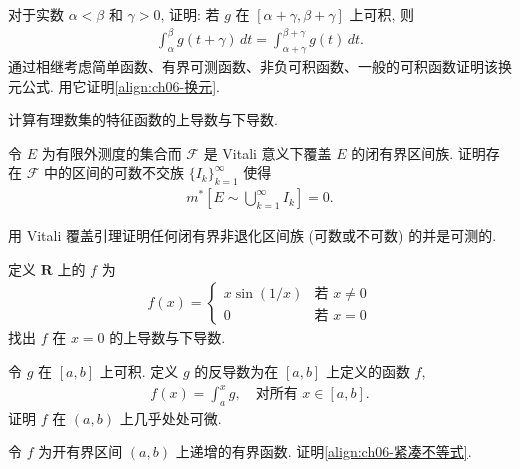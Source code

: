 \documentclass[../../main.tex]{subfiles}
\begin{document}
\begin{exercise}\label{exercise:ch06-11}
对于实数 $\alpha<\beta$ 和 $\gamma>0$, 证明: 若 $g$ 在 $[\alpha+\gamma,\beta+\gamma]$ 上可积, 则
\begin{align*}
\int_{\alpha}^{\beta}g(t+\gamma)\,dt=\int_{\alpha+\gamma}^{\beta+\gamma}g(t)\,dt.
\end{align*}
通过相继考虑简单函数、有界可测函数、非负可积函数、一般的可积函数证明该换元公式. 用它证明\eqref{align:ch06-换元}.
\end{exercise}

\begin{exercise}\label{exercise:ch06-12}
计算有理数集的特征函数的上导数与下导数.
\end{exercise}

\begin{exercise}\label{exercise:ch06-13}
令 $E$ 为有限外测度的集合而 $\mathcal{F}$ 是 Vitali 意义下覆盖 $E$ 的闭有界区间族. 证明存在 $\mathcal{F}$ 中的区间的可数不交族 $\{I_{k}\}_{k=1}^{\infty}$ 使得
\begin{align*}
m^{*}\left[E\sim\bigcup_{k=1}^{\infty}I_{k}\right]=0.
\end{align*}
\end{exercise}

\begin{exercise}\label{exercise:ch06-14}
用 Vitali 覆盖引理证明任何闭有界非退化区间族 (可数或不可数) 的并是可测的.
\end{exercise}

\begin{exercise}\label{exercise:ch06-15}
定义 $\mathbf{R}$ 上的 $f$ 为
\begin{align*}
f(x)=
\begin{cases}
x\sin(1/x)&\text{若 }x\neq 0\\
0&\text{若 }x=0
\end{cases}
\end{align*}
找出 $f$ 在 $x=0$ 的上导数与下导数.
\end{exercise}

\begin{exercise}\label{exercise:ch06-16}
令 $g$ 在 $[a,b]$ 上可积. 定义 $g$ 的反导数为在 $[a,b]$ 上定义的函数 $f$,
\begin{align*}
f(x)=\int_{a}^{x}g,\quad\text{对所有 }x\in[a,b].
\end{align*}
证明 $f$ 在 $(a,b)$ 上几乎处处可微.
\end{exercise}

\begin{exercise}\label{exercise:ch06-17}
令 $f$ 为开有界区间 $(a,b)$ 上递增的有界函数. 证明\eqref{align:ch06-紧凑不等式}.
\end{exercise}
\end{document}
